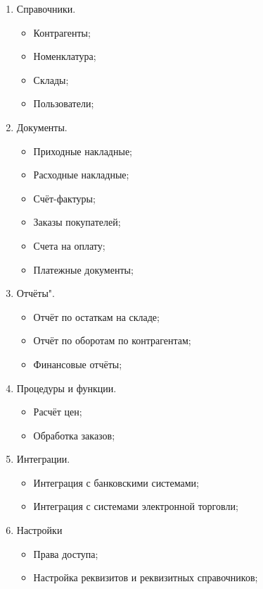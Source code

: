 \begin{enumerate}
	\item Справочники.
		\begin{itemize}
			\item Контрагенты;
			\item Номенклатура;
			\item Склады;
			\item Пользователи;
		\end{itemize}
	
	\item Документы.
		\begin{itemize}
			\item Приходные накладные;
			\item Расходные накладные;
			\item Счёт-фактуры;
			\item Заказы покупателей;
			\item Счета на оплату;
			\item Платежные документы;
		\end{itemize}
	
	\item Отчёты". 
		\begin{itemize}
			\item Отчёт по остаткам на складе;
			\item Отчёт по оборотам по контрагентам;
			\item Финансовые отчёты;
		\end{itemize}
	
	\item Процедуры и функции. 
		\begin{itemize}
			\item Расчёт цен;
			\item Обработка заказов;
		\end{itemize}
	
	\item Интеграции.
		\begin{itemize}
			\item Интеграция с банковскими системами;
			\item Интеграция с системами электронной торговли;
		\end{itemize}
		
		\item Настройки
			\begin{itemize}
				\item Права доступа;
				\item Настройка реквизитов и реквизитных справочников;
			\end{itemize}
\end{enumerate}


